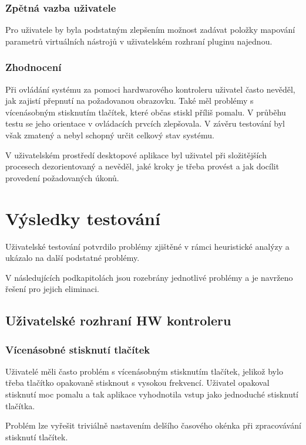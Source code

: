 \documentclass[thesis=M,czech]{FITthesis}[2019/03/06]
\begin{document}
			\subsubsection{Zpětná vazba uživatele}
				Pro uživatele by byla podstatným zlepšením možnost zadávat položky mapování parametrů virtuálních nástrojů v uživatelském rozhraní pluginu najednou.
			
			\subsubsection{Zhodnocení}
				Při ovládání systému za pomoci hardwarového kontroleru uživatel často nevěděl, jak zajistí přepnutí na požadovanou obrazovku. Také měl problémy s vícenásobným stisknutím tlačítek, které občas stiskl příliš pomalu. V průběhu testu se jeho orientace v ovládacích prvcích zlepšovala. V závěru testování byl však zmatený a nebyl schopný určit celkový stav systému.
				
				V uživatelském prostředí desktopové aplikace byl uživatel při složitějších procesech dezorientovaný a nevěděl, jaké kroky je třeba provést a jak docílit provedení požadovaných úkonů.
			
	\section{Výsledky testování}
		Uživatelské testování potvrdilo problémy zjištěné v rámci heuristické analýzy a ukázalo na další podstatné problémy.
		
		V následujících podkapitolách jsou rozebrány jednotlivé problémy a je navrženo řešení pro jejich eliminaci.
		
		\subsection{Uživatelské rozhraní HW kontroleru}
			\subsubsection{Vícenásobné stisknutí tlačítek}
				Uživatelé měli často problém s vícenásobným stisknutím tlačítek, jelikož bylo třeba tlačítko opakovaně stisknout s vysokou frekvencí.
				Uživatel opakoval stisknutí moc pomalu a tak aplikace vyhodnotila vstup jako jednoduché stisknutí tlačítka.
				
				Problém lze vyřešit triviálně nastavením delšího časového okénka při zpracovávání stisknutí tlačítek.
				
\end{document}
